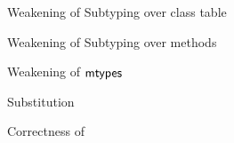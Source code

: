 \documentclass[acmlarge, anonymous, authordraft, review]{acmart} %
\begin{document}
\begin{lemma}{Weakening of Subtyping over class table}{}
  \begin{conds}
    \cond{$\StrSub\M{\K}\t\tp$}
  \end{conds}

  \then\axiom{$\StrSub\M{\K~\Kp}\t\tp$}

\end{lemma}

\begin{lemma}{Weakening of Subtyping over methods}{}
  \begin{conds}
    \cond{$\StrSub\M{\K}\t\tp$}
  \end{conds}

  \then{}

\end{lemma}

\begin{lemma}{Weakening of ${\sf{mtypes}}$}{}
  \begin{conds}
    \cond{$\Mtype\m{\HT\x\t}\tp \in \App\K\C$}
  \end{conds}

  \then{}

\end{lemma}

\begin{lemma}{Substitution}{}
  \begin{conds}
    \cond{$\EnvType{\b{\HT\x\tp}}\s\K\e\t$}    
    \cond{$\b{\EnvType\cdot\s\K\a\tp}$}
  \end{conds}

  \then\axiom{$\EnvType\cdot\s\K{[\a/\x]\e}\t$}

\end{lemma}

\begin{lemma}{Correctness of \App\K\C}{}
  \begin{conds}
    \cond{$\Mtype\m{\t}\tp \in \App\K\C$}    
    \cond{$\EnvType\cdot\s\K\a\C$}
    \cond{$\EnvType\cdot\s\K\ap\t$}
    \cond{$\EnvType\cdot\s\K\epp\tp$}
  \end{conds}

  \then\axiom{$\Reduce \K{\KCall\a\m{\ap}{\t}{\tp}}\s \K\epp\s$}

\end{lemma}
\end{document}
